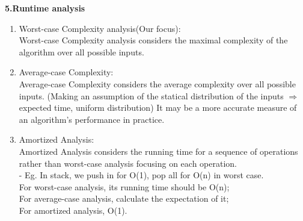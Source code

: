 \textbf{5.Runtime analysis}
\begin{enumerate}
\item 
Worst-case Complexity analysis(Our focus):\\
Worst-case Complexity analysis considers the maximal complexity of the algorithm over all possible inputs.
\item
Average-case Complexity: \\
Average-case Complexity considers the average complexity over all possible inputs. (Making an assumption of the statical distribution of the inputs $\Rightarrow$ expected time, uniform distribution) It may be a more accurate measure of an algorithm's performance in practice. 
\item
Amortized Analysis:\\
Amortized Analysis considers the running time for a sequence of operations rather than worst-case analysis focusing on each operation. \\

- Eg. In stack, we push in for O(1), pop all for O(n) in worst case.\\
For worst-case analysis, its running time should be O(n);\\
For average-case analysis, calculate the expectation of it; \\
For amortized analysis, O(1). 
\end{enumerate}


